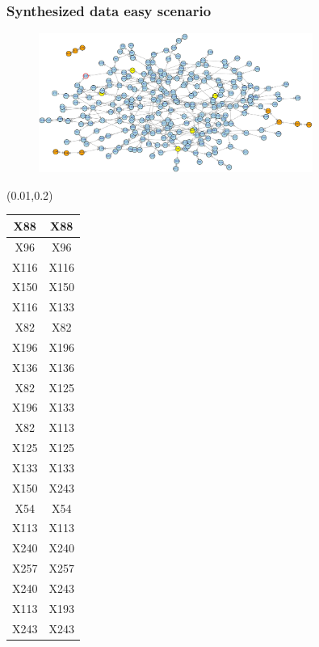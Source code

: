 \documentclass{beamer}
\newcommand{\boz}{\cellcolor{pathwaynode}}
\newcommand{\ghool}{\cellcolor{independentnode}}
\begin{document}
\begin{frame}[plain]
  \frametitle{Synthesized data easy scenario}
  \begin{figure}
    \includegraphics[width=0.8\textwidth]{synthesized-easy}
  \end{figure}
  \begin{textblock*}{\paperwidth}(0.01\textwidth,0.2\textheight)
    \raggedright 
    \tiny
    \begin{tabular}{| c c |}
      \hline
\ghool X88   &  \ghool X88  \\ \hline
\ghool X96   &  \ghool X96  \\ \hline
\boz X116   &  \boz X116  \\ \hline
\boz X150   &  \boz X150  \\ \hline
\boz X116   &  \boz X133  \\ \hline
\boz X82   &  \boz X82  \\ \hline
\boz X196   &  \boz X196  \\ \hline
\ghool X136   &  \ghool X136  \\ \hline
\boz X82   &  \boz X125  \\ \hline
\boz X196   &  \boz X133  \\ \hline
\boz X82   &  \boz X113  \\ \hline
\boz X125   &  \boz X125  \\ \hline
\boz X133   &  \boz X133  \\ \hline
\boz X150   &  \boz X243  \\ \hline
\ghool X54   &  \ghool X54  \\ \hline
\boz X113   &  \boz X113  \\ \hline
\boz X240   &  \boz X240  \\ \hline
\ghool X257   &  \ghool X257  \\ \hline
\boz X240   &  \boz X243  \\ \hline
\boz X113   &  \boz X193  \\ \hline
\boz X243   &  \boz X243  \\ \hline

\end{tabular}
\end{textblock*}
\end{frame}
\end{document}
